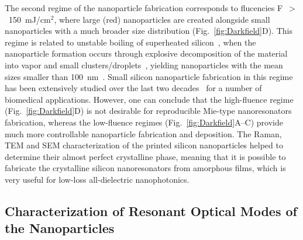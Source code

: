                 The second regime of the nanoparticle fabrication corresponds to flucencies F~$>$~150~mJ/cm$^{2}$, where large (red) nanoparticles
            are created alongside small nanoparticles with a much broader size distribution (Fig.~\ref{fig:Darkfield}D). This regime is related to
            unstable boiling of superheated silicon~\cite{bulgakova2001pulsed, ionin2013thermal, wu2014microscopic}, when the
            nanoparticle formation occurs through explosive decomposition of the material into vapor and small
            clusters/droplets~\cite{itina2009molecular,wu2014microscopic}, yielding nanoparticles with the mean sizes smaller than
            100~nm~\cite{amoruso2004generation}. Small silicon nanoparticle fabrication in this regime has been extensively studied
            over the last two decades~\cite{amoruso2004generation, tull2006formation} for a number of biomedical applications.
            However, one can conclude that the high-fluence regime (Fig.~\ref{fig:Darkfield}D) is not desirable for reproducible Mie-type
            nanoresonators fabrication, whereas the low-fluence regimes (Fig.~\ref{fig:Darkfield}A--C) provide much more controllable
            nanoparticle fabrication and deposition. The Raman, TEM and SEM characterization of the printed silicon nanoparticles
            helped to determine their almost perfect crystalline phase, meaning that it is possible to fabricate the crystalline
            silicon nanoresonators from amorphous films, which is very useful for low-loss all-dielectric nanophotonics.

    \subsection{Characterization of Resonant Optical Modes of the Nanoparticles}
        \label{sec:DarkfieldExp}

